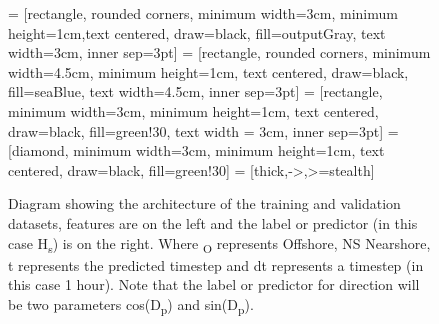 \documentclass[review]{elsarticle}
\begin{document}
\begin{figure}[!htbh]
\usetikzlibrary{shapes.geometric, arrows}
 = [rectangle, rounded corners, minimum width=3cm, minimum height=1cm,text centered, draw=black, fill=outputGray, text width=3cm, inner sep=3pt]
 = [rectangle, rounded corners, minimum width=4.5cm, minimum height=1cm, text centered, draw=black, fill=seaBlue, text width=4.5cm, inner sep=3pt]
 = [rectangle, minimum width=3cm, minimum height=1cm, text centered, draw=black, fill=green!30, text width = 3cm, inner sep=3pt]
 = [diamond, minimum width=3cm, minimum height=1cm, text centered, draw=black, fill=green!30]
 = [thick,->,>=stealth]
\caption{Diagram showing the architecture of the training and validation datasets, features are on the left and the label or predictor (in this case H\textsubscript{s}) is on the right. Where \textsubscript{O} represents Offshore, NS Nearshore, t represents the predicted timestep and dt represents a timestep (in this case 1 hour). Note that the label or predictor for direction will be two parameters cos(D\textsubscript{p}) and sin(D\textsubscript{p}).}
\label{fig:NNTrainingDiagram}
\end{figure}
\end{document}
